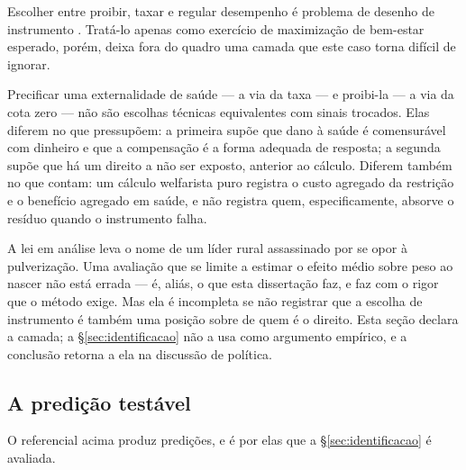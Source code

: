Escolher entre proibir, taxar e regular desempenho é problema de desenho de
instrumento \citep{roth2002engineer}. Tratá-lo apenas como exercício de
maximização de bem-estar esperado, porém, deixa fora do quadro uma camada que
este caso torna difícil de ignorar.

Precificar uma externalidade de saúde --- a via da taxa --- e proibi-la --- a via
da cota zero --- não são escolhas técnicas equivalentes com sinais trocados.
Elas diferem no que pressupõem: a primeira supõe que dano à saúde é comensurável
com dinheiro e que a compensação é a forma adequada de resposta; a segunda supõe
que há um direito a não ser exposto, anterior ao cálculo. Diferem também no que
contam: um cálculo welfarista puro registra o custo agregado da restrição e o
benefício agregado em saúde, e não registra quem, especificamente, absorve o
resíduo quando o instrumento falha.

A lei em análise leva o nome de um líder rural assassinado por se opor à
pulverização. Uma avaliação que se limite a estimar o efeito médio sobre peso ao
nascer não está errada --- é, aliás, o que esta dissertação faz, e faz com o rigor
que o método exige. Mas ela é incompleta se não registrar que a escolha de
instrumento é também uma posição sobre de quem é o direito. Esta seção declara a
camada; a §\ref{sec:identificacao} não a usa como argumento empírico, e a
conclusão retorna a ela na discussão de política.

\subsection{A predição testável}
\label{sub:predicao}

O referencial acima produz predições, e é por elas que a §\ref{sec:identificacao}
é avaliada.

